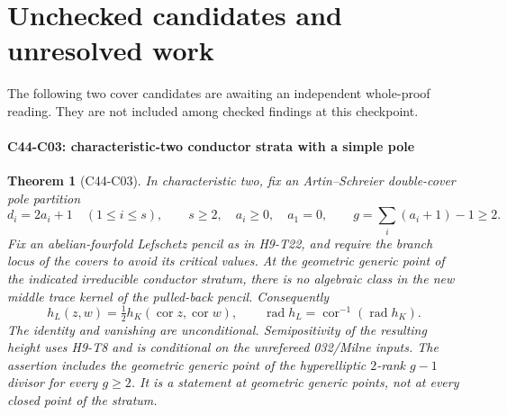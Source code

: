 \documentclass[11pt]{article}
\newtheorem{theorem}{Theorem}[section]
\theoremstyle{remark}\newtheorem{remark}[theorem]{Remark}
\begin{document}

\part{Unchecked candidates and unresolved work}
The following two cover candidates are awaiting an independent whole-proof reading. They are not included among checked findings at this checkpoint.
\subsection{C44-C03: characteristic-two conductor strata with a simple pole}
\begin{theorem}[C44-C03]\label{thm:AS-strata}
In characteristic two, fix an Artin--Schreier double-cover pole partition
\[
 d_i=2a_i+1\quad(1\le i\le s),\qquad
 s\ge2,\quad a_i\ge0,\quad a_1=0,
 \qquad g=\sum_i(a_i+1)-1\ge2.
\]
Fix an abelian-fourfold Lefschetz pencil as in H9-T22, and require the
branch locus of the covers to avoid its critical values. At the geometric
generic point of the indicated irreducible conductor stratum, there is
no algebraic class in the new middle trace kernel of the pulled-back
pencil. Consequently
\[
 h_L(z,w)=\tfrac12h_K(\operatorname{cor}z,\operatorname{cor}w),
 \qquad \operatorname{rad}h_L=
 \operatorname{cor}^{-1}(\operatorname{rad}h_K).
 \tag{C44.C03.1}
\]
The identity and vanishing are unconditional. Semipositivity of the
resulting height uses H9-T8 and is conditional on the unrefereed
032/Milne inputs. The assertion includes the geometric generic point
of the hyperelliptic $2$-rank $g-1$ divisor for every $g\ge2$.
It is a statement at geometric generic points, not at every closed
point of the stratum.
\end{theorem}
\end{document}

